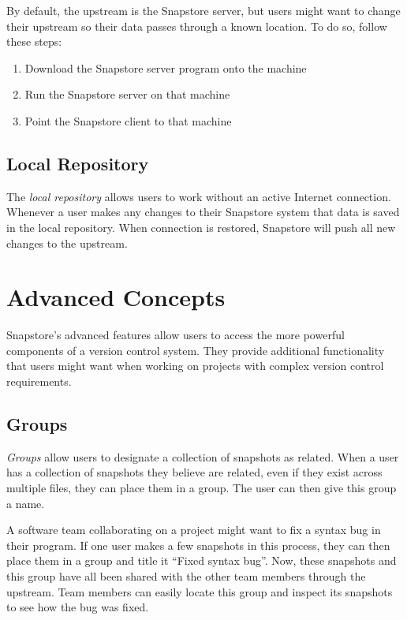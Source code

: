 By default, the upstream is the Snapstore server, but users might want to change their upstream so their data passes through a known location. To do so, follow these steps:
\begin{enumerate}
  \item{Download the Snapstore server program onto the machine}
  \item{Run the Snapstore server on that machine}
  \item{Point the Snapstore client to that machine}
\end{enumerate}

\subsection{Local Repository}

The \textit{local repository} allows users to work without an active Internet connection. Whenever a user makes any changes to their Snapstore system that data is saved in the local repository. When connection is restored, Snapstore will push all new changes to the upstream.

\section{Advanced Concepts}

Snapstore's advanced features allow users to access the more powerful components of a version control system. They provide additional functionality that users might want when working on projects with complex version control requirements.

\subsection{Groups}

\textit{Groups} allow users to designate a collection of snapshots as related. When a user has a collection of snapshots they believe are related, even if they exist across multiple files, they can place them in a group. The user can then give this group a name.

A software team collaborating on a project might want to fix a syntax bug in their program. If one user makes a few snapshots in this process, they can then place them in a group and title it ``Fixed syntax bug''. Now, these snapshots and this group have all been shared with the other team members through the upstream. Team members can easily locate this group and inspect its snapshots to see how the bug was fixed. 

